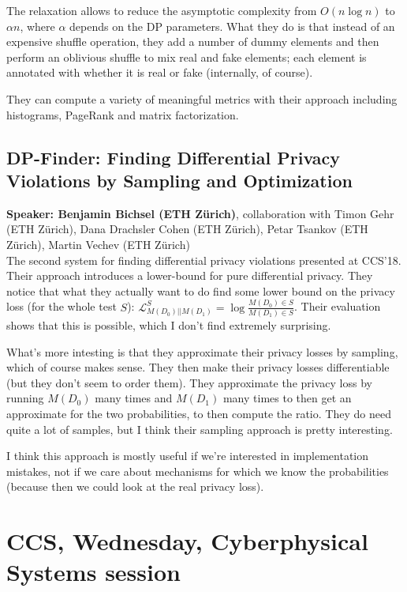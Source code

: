 \documentclass{article}
\begin{document}
The relaxation allows to reduce the asymptotic complexity from $O(n\log n)$ to $\alpha n$, where $\alpha$ depends on the DP parameters.  What they do is that instead of an expensive shuffle operation, they add a number of dummy elements and then perform an oblivious shuffle to mix real and fake elements; each element is annotated with whether it is real or fake (internally, of course).

They can compute a variety of meaningful metrics with their approach including histograms, PageRank and matrix factorization.

\subsection{DP-Finder: Finding Differential Privacy Violations by Sampling and Optimization}
\noindent\textbf{Speaker: Benjamin Bichsel (ETH Zürich)}, collaboration with Timon Gehr (ETH Zürich), Dana Drachsler Cohen (ETH Zürich), Petar Tsankov (ETH Zürich), Martin Vechev (ETH Zürich)\\

The second system for finding differential privacy violations presented at CCS'18. Their approach introduces a lower-bound for pure differential privacy. They notice that what they actually want to do find some lower bound on the privacy loss (for the whole test $S$): $\mathcal L^S_{M(D_0)||M(D_1)} = \log\frac{M(D_0) \in S}{M(D_1) \in S}$. Their evaluation shows that this is possible, which I don't find extremely surprising.

What's more intesting is that they approximate their privacy losses by sampling, which of course makes sense. They then make their privacy losses differentiable (but they don't seem to order them). They approximate the privacy loss by running $M(D_0)$ many times and $M(D_1)$ many times to then get an approximate for the two probabilities, to then compute the ratio. They do need quite a lot of samples, but I think their sampling approach is pretty interesting.

I think this approach is mostly useful if we're interested in implementation mistakes, not if we care about mechanisms for which we know the probabilities (because then we could look at the real privacy loss).

\section{CCS, Wednesday, Cyberphysical Systems session}
\end{document}
